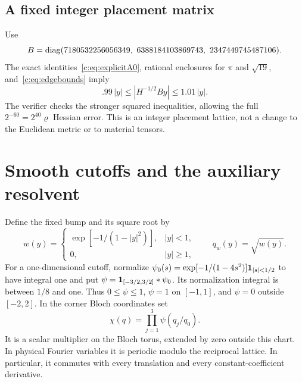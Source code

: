 \subsection{A fixed integer placement matrix}
Use
\begin{equation}
 B=\diag(7180532256056349,\ 6388184103869743,\ 2347449745487106).
                                                               \label{c:eq:B}
\end{equation}
The exact identities~\eqref{c:eq:explicitA0}, rational enclosures for $\pi$
and $\sqrt{19}$, and~\eqref{c:eq:edgebounds} imply
\begin{equation}
 .99\,|y|\le|H^{-1/2}By|\le1.01\,|y|.               \label{c:eq:Bmetric}
\end{equation}
The verifier checks the stronger squared inequalities, allowing the full
$2^{-60}=2^{40}\varrho$ Hessian error. This is an integer placement
lattice, not a change to the Euclidean metric or to material tensors.

\section{Smooth cutoffs and the auxiliary resolvent}
\label{c:sec:cutoff}

Define the fixed bump and its square root by
\begin{equation}
 w(y)=\begin{cases}\exp[-1/(1-|y|^2)],&|y|<1,\\0,&|y|\ge1,\end{cases}
 \qquad q_w(y)=\sqrt{w(y)}.                           \label{c:eq:well}
\end{equation}
For a one-dimensional cutoff, normalize
$\psi_0(s)=\exp[-1/(1-4s^2)]\mathbf 1_{|s|<1/2}$ to have integral one and put
$\psi=\mathbf 1_{[-3/2,3/2]}*\psi_0$. Its normalization integral is between
$1/8$ and one. Thus $0\le\psi\le1$, $\psi=1$ on $[-1,1]$, and
$\psi=0$ outside $[-2,2]$. In the corner Bloch coordinates set
\begin{equation}
 \chi(q)=\prod_{j=1}^3\psi(q_j/q_0).                \label{c:eq:chi}
\end{equation}
It is a scalar multiplier on the Bloch torus, extended by zero outside
this chart. In physical Fourier variables it is periodic modulo the
reciprocal lattice. In particular, it commutes with every translation
and every constant-coefficient derivative.

